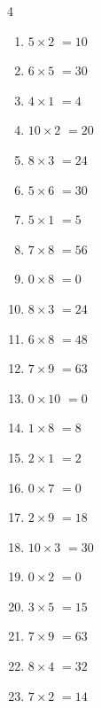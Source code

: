 \begin{multicols}{4}
\begin{enumerate}
  \item $5\times 2$
        $=10$

  \item $6\times 5$
        $=30$

  \item $4\times 1$
        $=4$

  \item $10\times 2$
        $=20$

  \item $8\times 3$
        $=24$

  \item $5\times 6$
        $=30$

  \item $5\times 1$
        $=5$

  \item $7\times 8$
        $=56$

  \item $0\times 8$
        $=0$

  \item $8\times 3$
        $=24$

  \item $6\times 8$
        $=48$

  \item $7\times 9$
        $=63$

  \item $0\times 10$
        $=0$

  \item $1\times 8$
        $=8$

  \item $2\times 1$
        $=2$

  \item $0\times 7$
        $=0$

  \item $2\times 9$
        $=18$

  \item $10\times 3$
        $=30$

  \item $0\times 2$
        $=0$

  \item $3\times 5$
        $=15$

  \item $7\times 9$
        $=63$

  \item $8\times 4$
        $=32$

  \item $7\times 2$
        $=14$


\end{enumerate}
\end{multicols}
